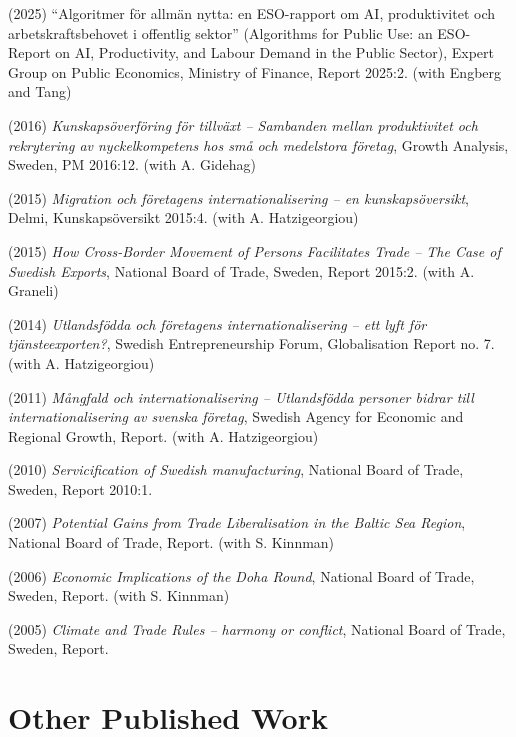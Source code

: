 \documentclass[11pt,a4paper]{article}
\newcommand{\publication}[1]{\item #1}
\begin{document}
\begin{enumerate}[label={[\arabic*]}]

\publication{(2025) ``Algoritmer för allmän nytta: en ESO-rapport om AI, produktivitet och arbetskraftsbehovet i offentlig sektor'' (Algorithms for Public Use: an ESO-Report on AI, Productivity, and Labour Demand in the Public Sector), Expert Group on Public Economics, Ministry of Finance, Report 2025:2. (with Engberg and Tang)}

\publication{(2016) \textit{Kunskapsöverföring för tillväxt -- Sambanden mellan produktivitet och rekrytering av nyckelkompetens hos små och medelstora företag}, Growth Analysis, Sweden, PM 2016:12. (with A. Gidehag)}

\publication{(2015) \textit{Migration och företagens internationalisering -- en kunskapsöversikt}, Delmi, Kunskapsöversikt 2015:4. (with A. Hatzigeorgiou)}

\publication{(2015) \textit{How Cross-Border Movement of Persons Facilitates Trade -- The Case of Swedish Exports}, National Board of Trade, Sweden, Report 2015:2. (with A. Graneli)}

\publication{(2014) \textit{Utlandsfödda och företagens internationalisering -- ett lyft för tjänsteexporten?}, Swedish Entrepreneurship Forum, Globalisation Report no. 7. (with A. Hatzigeorgiou)}

\publication{(2011) \textit{Mångfald och internationalisering -- Utlandsfödda personer bidrar till internationalisering av svenska företag}, Swedish Agency for Economic and Regional Growth, Report. (with A. Hatzigeorgiou)}

\publication{(2010) \textit{Servicification of Swedish manufacturing}, National Board of Trade, Sweden, Report 2010:1.}

\publication{(2007) \textit{Potential Gains from Trade Liberalisation in the Baltic Sea Region}, National Board of Trade, Report. (with S. Kinnman)}

\publication{(2006) \textit{Economic Implications of the Doha Round}, National Board of Trade, Sweden, Report. (with S. Kinnman)}

\publication{(2005) \textit{Climate and Trade Rules -- harmony or conflict}, National Board of Trade, Sweden, Report.}

\end{enumerate}

\section{Other Published Work}
\end{document}
